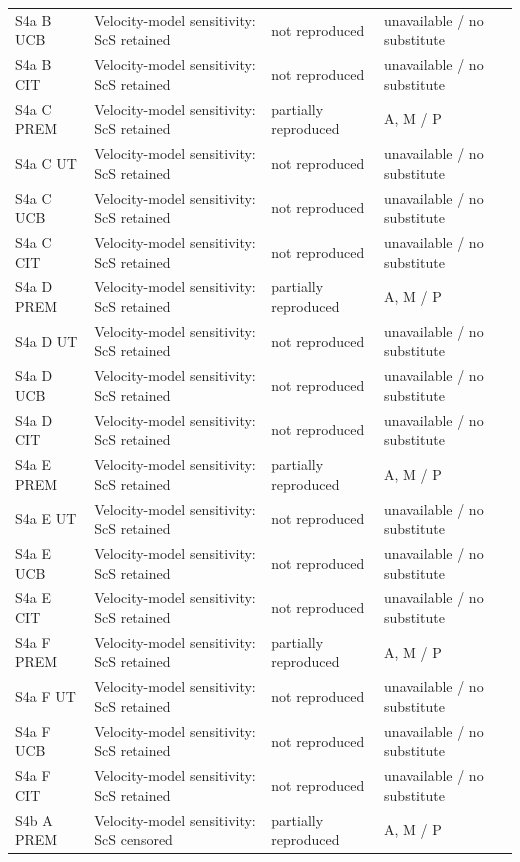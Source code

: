\documentclass[10pt]{article}
\begin{document}
\begin{longtable}{p{.23\linewidth}p{.25\linewidth}p{.19\linewidth}p{.22\linewidth}}
S4a B UCB & Velocity-model sensitivity: ScS retained & not reproduced & unavailable / no substitute \\
S4a B CIT & Velocity-model sensitivity: ScS retained & not reproduced & unavailable / no substitute \\
S4a C PREM & Velocity-model sensitivity: ScS retained & partially reproduced & A, M / P \\
S4a C UT & Velocity-model sensitivity: ScS retained & not reproduced & unavailable / no substitute \\
S4a C UCB & Velocity-model sensitivity: ScS retained & not reproduced & unavailable / no substitute \\
S4a C CIT & Velocity-model sensitivity: ScS retained & not reproduced & unavailable / no substitute \\
S4a D PREM & Velocity-model sensitivity: ScS retained & partially reproduced & A, M / P \\
S4a D UT & Velocity-model sensitivity: ScS retained & not reproduced & unavailable / no substitute \\
S4a D UCB & Velocity-model sensitivity: ScS retained & not reproduced & unavailable / no substitute \\
S4a D CIT & Velocity-model sensitivity: ScS retained & not reproduced & unavailable / no substitute \\
S4a E PREM & Velocity-model sensitivity: ScS retained & partially reproduced & A, M / P \\
S4a E UT & Velocity-model sensitivity: ScS retained & not reproduced & unavailable / no substitute \\
S4a E UCB & Velocity-model sensitivity: ScS retained & not reproduced & unavailable / no substitute \\
S4a E CIT & Velocity-model sensitivity: ScS retained & not reproduced & unavailable / no substitute \\
S4a F PREM & Velocity-model sensitivity: ScS retained & partially reproduced & A, M / P \\
S4a F UT & Velocity-model sensitivity: ScS retained & not reproduced & unavailable / no substitute \\
S4a F UCB & Velocity-model sensitivity: ScS retained & not reproduced & unavailable / no substitute \\
S4a F CIT & Velocity-model sensitivity: ScS retained & not reproduced & unavailable / no substitute \\
S4b A PREM & Velocity-model sensitivity: ScS censored & partially reproduced & A, M / P \\

\end{longtable}
\end{document}
